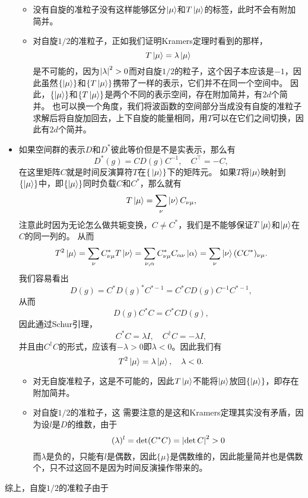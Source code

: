 \begin{itemize}
\begin{itemize}
        \item 没有自旋的准粒子没有这样能够区分$\ket{\mu}$和$T \ket{\mu}$的标签，此时不会有附加简并。%
        \item 对自旋$1/2$的准粒子，正如我们证明Kramers定理时看到的那样，
        \[
            T \ket*{\mu} = \lambda \ket*{\mu}
        \]
        是不可能的，因为$\abs{\lambda}^2 > 0$而对自旋$1/2$的粒子，这个因子本应该是$-1$，因此虽然$\{\ket{\mu}\}$和$\{T \ket{\mu}\}$携带了一样的表示，它们并不在同一个空间中。
        因此，$\{\ket{\mu}\}$和$\{T \ket{\mu}\}$是两个不同的表示空间，存在附加简并，有$2d$个简并。
        也可以换一个角度，我们将波函数的空间部分当成没有自旋的准粒子求解后将自旋加回去，上下自旋的能量相同，用$T$可以在它们之间切换，因此有$2d$个简并。
    \end{itemize}
    \item 如果空间群的表示$D$和$D^*$彼此等价但是不是实表示，那么有
    \[
        D^*(g) = C D(g) C^{-1}, \quad C^\top = - C,
    \]
    在这里矩阵$C$就是时间反演算符$T$在$\{\ket*{\mu}\}$下的矩阵元。
    如果$T$将$\ket{\mu}$映射到$\{\ket{\mu}\}$中，即$\{\ket{\mu}\}$同时负载$C$和$C^*$，那么就有
    \[
        T \ket{\mu} = \sum_\nu \ket{\nu} C_{\nu \mu},
    \]
    注意此时因为无论怎么做共轭变换，$C \neq C^*$，我们是不能够保证$T \ket{\mu}$和$\ket{\mu}$在$C$的同一列的。
    从而
    \[
        T^2 \ket{\mu} = \sum_\nu C_{\nu \mu}^* T \ket{\nu} = \sum_{\nu, \alpha} C_{\nu \mu}^* C_{\alpha \nu} \ket{\alpha} = \sum_\nu \ket{\nu} (C C^*)_{\nu \mu}.
    \]
    我们容易看出
    \[
        D(g) = C^* D(g)^* C^{*-1} = C^* C D(g) C^{-1} C^{*-1},
    \]
    从而
    \[
        D(g) C^* C = C^* C D(g),
    \]
    因此通过Schur引理，
    \[
        C^* C = \lambda I, \quad C^\dagger C = - \lambda I,
    \]
    并且由$C^\dagger C$的形式，应该有$-\lambda > 0$即$\lambda < 0$。因此我们有
    \[
        T^2 \ket{\mu} = \lambda \ket{\mu}, \quad \lambda < 0.
    \]
    \begin{itemize}
        \item 对无自旋准粒子，这是不可能的，因此$T \ket{\mu}$不能将$\ket{\mu}$放回$\{\ket{\mu}\}$，即存在附加简并。
        \item 对自旋$1/2$的准粒子，这 %
        需要注意的是这和Kramers定理其实没有矛盾，因为设$l$是$D$的维数，由于
        \[
            (\lambda)^l = \det(C^* C) = \abs{\det C}^2 > 0
        \]
        而$\lambda$是负的，只能有$l$是偶数，因此$\{\mu\}$是偶数维的，因此能量简并也是偶数个，只不过这回不是因为时间反演操作带来的。
    \end{itemize}
\end{itemize}
综上，自旋$1/2$的准粒子由于%

